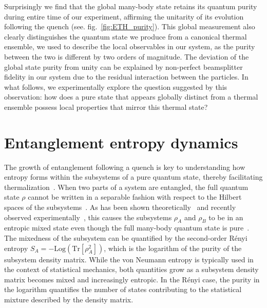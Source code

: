 Surprisingly we find that the global many-body state retains its quantum purity during entire time of our experiment, affirming the unitarity of its evolution following the quench (see. fig.~\ref{fig:ETH_purity}). This global measurement also clearly distinguishes the quantum state we produce from a canonical thermal ensemble, we used to describe the local observables in our system, as the purity between the two is different by two orders of magnitude. The deviation of the global state purity from unity can be explained by non-perfect beamsplitter fidelity in our system due to the residual interaction between the particles. In what follows, we experimentally explore the question suggested by this observation: how does a pure state that appears globally distinct from a thermal ensemble possess local properties that mirror this thermal state?

\section{Entanglement entropy dynamics}
The growth of entanglement following a quench is key to understanding how entropy forms within the subsystems of a pure quantum state, thereby facilitating thermalization~\cite{CardyOneD, Daley2012, Schachenmayer2013, Hazzard2014}. When two parts of a system are entangled, the full quantum state $\rho$ cannot be written in a separable fashion with respect to the Hilbert spaces of the subsystems~\cite{HHHH,Horodecki1996a}. As has been shown theoretically~\cite{JakschPRA, Daley2012} and recently observed experimentally~\cite{Islam2015}, this causes the subsystems $\rho_A$ and $\rho_B$ to be in an entropic mixed state even though the full many-body quantum state is pure~\cite{Horodecki1996a}. The mixedness of the subsystem can be quantified by the second-order R\'{e}nyi entropy $S_A = -\textrm{Log}(\textrm{Tr}[\rho_A^2])$, which is the logarithm of the purity of the subsystem density matrix. While the von Neumann entropy is typically used in the context of statistical mechanics, both quantities grow as a subsystem density matrix becomes mixed and increasingly entropic. In the R\'{e}nyi case, the purity in the logarithm quantifies the number of states contributing to the statistical mixture described by the density matrix. 

